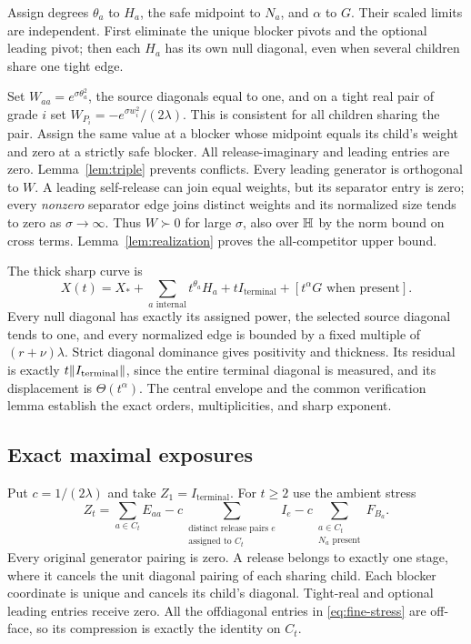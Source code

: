 Assign degrees $\theta_a$ to $H_a$, the safe midpoint to $N_a$, and $\alpha$ to $G$. Their scaled limits are independent. First eliminate the unique blocker pivots and the optional leading pivot; then each $H_a$ has its own null diagonal, even when several children share one tight edge.

Set $W_{aa}=e^{\sigma\theta_a^2}$, the source diagonals equal to one, and on a tight real pair of grade $i$ set $W_{P_i}=-e^{\sigma w_i^2}/(2\lambda)$. This is consistent for all children sharing the pair. Assign the same value at a blocker whose midpoint equals its child's weight and zero at a strictly safe blocker. All release-imaginary and leading entries are zero. Lemma~\ref{lem:triple} prevents conflicts. Every leading generator is orthogonal to $W$. A leading self-release can join equal weights, but its separator entry is zero; every \emph{nonzero} separator edge joins distinct weights and its normalized size tends to zero as $\sigma\to\infty$. Thus $W\succ0$ for large $\sigma$, also over $\mathbb H$ by the norm bound on cross terms. Lemma~\ref{lem:realization} proves the all-competitor upper bound.

The thick sharp curve is
\[
 X(t)=X_*+\sum_{a\text{ internal}}t^{\theta_a}H_a
       +tI_{\mathrm{terminal}}+[t^\alpha G\text{ when present}].
\]
Every null diagonal has exactly its assigned power, the selected source diagonal tends to one, and every normalized edge is bounded by a fixed multiple of $(r+\nu)\lambda$. Strict diagonal dominance gives positivity and thickness. Its residual is exactly $t\lVert I_{\mathrm{terminal}}\rVert$, since the entire terminal diagonal is measured, and its displacement is $\Theta(t^\alpha)$. The central envelope and the common verification lemma establish the exact orders, multiplicities, and sharp exponent.

\subsection{Exact maximal exposures}
Put $c=1/(2\lambda)$ and take $Z_1=I_{\mathrm{terminal}}$. For $t\ge2$ use the ambient stress
\begin{equation}\label{eq:fine-stress}
 Z_t=\sum_{a\in C_t}E_{aa}
 -c\sum_{\substack{\text{distinct release pairs }e\\\text{assigned to }C_t}} I_e
 -c\sum_{\substack{a\in C_t\\N_a\text{ present}}}F_{B_a}.
\end{equation}
Every original generator pairing is zero. A release belongs to exactly one stage, where it cancels the unit diagonal pairing of each sharing child. Each blocker coordinate is unique and cancels its child's diagonal. Tight-real and optional leading entries receive zero. All the offdiagonal entries in \eqref{eq:fine-stress} are off-face, so its compression is exactly the identity on $C_t$.

